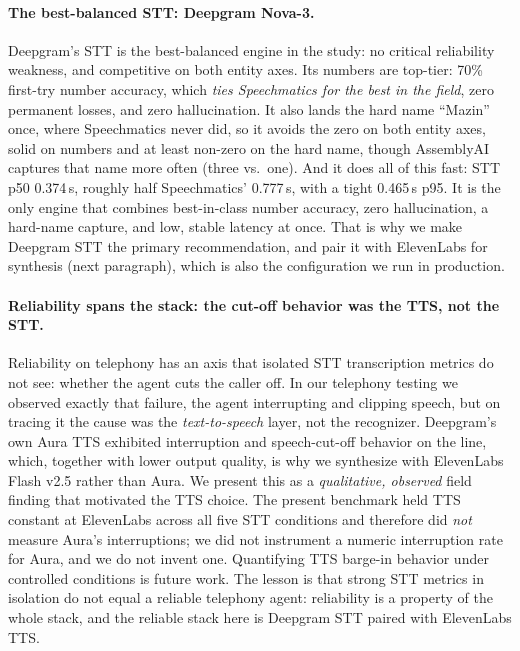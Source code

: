 \documentclass[11pt]{article}
\begin{document}
\paragraph{The best-balanced STT: Deepgram Nova-3.}
Deepgram's STT is the best-balanced engine in the study: no critical reliability
weakness, and competitive on both entity axes. Its numbers are top-tier: 70\%
first-try number accuracy, which \emph{ties Speechmatics for the best in the
field}, zero permanent losses, and zero hallucination. It also lands the hard
name ``Mazin'' once, where Speechmatics never did, so it avoids the zero on both
entity axes, solid on numbers and at least non-zero on the hard name, though
AssemblyAI captures that name more often (three vs.\ one). And it does all of
this fast: STT p50 0.374\,s, roughly half Speechmatics' 0.777\,s, with a tight
0.465\,s p95. It is the only engine that combines best-in-class number accuracy,
zero hallucination, a hard-name capture, and low, stable latency at once. That
is why we make Deepgram STT the primary recommendation, and pair it with
ElevenLabs for synthesis (next paragraph), which is also the configuration we run
in production.

\paragraph{Reliability spans the stack: the cut-off behavior was the TTS, not the
STT.}
Reliability on telephony has an axis that isolated STT transcription metrics do
not see: whether the agent cuts the caller off. In our telephony testing we
observed exactly that failure, the agent interrupting and clipping speech, but
on tracing it the cause was the \emph{text-to-speech} layer, not the recognizer.
Deepgram's own Aura TTS exhibited interruption and speech-cut-off behavior on the
line, which, together with lower output quality, is why we synthesize with
ElevenLabs Flash v2.5 rather than Aura. We present this as a \emph{qualitative,
observed} field finding that motivated the TTS choice. The present benchmark
held TTS constant at ElevenLabs across all five STT conditions and therefore did
\emph{not} measure Aura's interruptions; we did not instrument a numeric
interruption rate for Aura, and we do not invent one. Quantifying TTS barge-in
behavior under controlled conditions is future work. The lesson is that strong
STT metrics in isolation do not equal a reliable telephony agent: reliability is
a property of the whole stack, and the reliable stack here is Deepgram STT paired
with ElevenLabs TTS.
\end{document}
